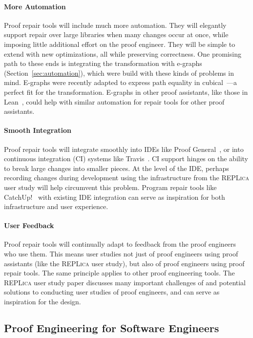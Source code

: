 \paragraph{More Automation}
Proof repair tools will include much more automation.
They will elegantly support repair over large libraries when many changes occur at once,
while imposing little additional effort on the proof engineer.
They will be simple to extend with new optimizations, all while preserving correctness.
One promising path to these ends is integrating the \toolnamec transformation with e-graphs (Section~\ref{sec:automation}),
which were build with these kinds of problems in mind.
E-graphs were recently adapted to express path equality in cubical~\cite{egraph6}---a perfect fit for the \toolnamec transformation.
E-graphs in other proof assistants, like those in Lean~\cite{selsam:lean}, could help with similar automation for repair tools for other proof assistants.

\paragraph{Smooth Integration}
Proof repair tools will integrate smoothly into IDEs like Proof General~\cite{proofgeneral},
or into continuous integration (CI) systems like Travis~\cite{travis}.
CI support hinges on the ability to break large changes into smaller pieces.
At the level of the IDE, perhaps recording changes during development using the infrastructure
from the \textsc{REPLica} user study will help circumvent this problem.
Program repair tools like CatchUp!~\cite{Henkel:2005:CCR:1062455.1062512} with existing IDE integration can
serve as inspiration for both infrastructure and user experience.

\paragraph{User Feedback} 
Proof repair tools will continually adapt to feedback from the proof engineers who use them.
This means user studies not just of proof engineers using proof assistants (like the \textsc{REPLica} user study),
but also of proof engineers using proof repair tools.
The same principle applies to other proof engineering tools.
The \textsc{REPLica} user study paper discusses many important challenges of and potential solutions to conducting user studies
of proof engineers, and can serve as inspiration for the design.

\subsection*{Proof Engineering for Software Engineers}

